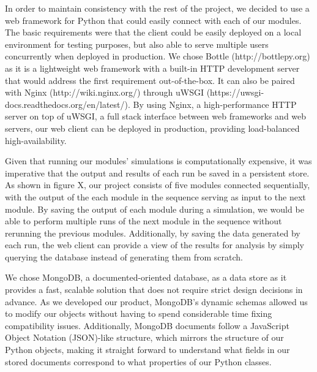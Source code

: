 \documentclass[a4paper,11pt]{article}
\begin{document}
In order to maintain consistency with the rest of the project, we decided to use a web framework for Python that could easily connect with each of our modules. The basic requirements were that the client could be easily deployed on a local environment for testing purposes, but also able to serve multiple users concurrently when deployed in production. We chose Bottle (http://bottlepy.org) as it is a lightweight web framework with a built-in HTTP development server that would address the first requirement out-of-the-box. It can also be paired with Nginx (http://wiki.nginx.org/) through uWSGI (https://uwsgi-docs.readthedocs.org/en/latest/). By using Nginx, a high-performance HTTP server on top of uWSGI, a full stack interface between web frameworks and web servers, our web client can be deployed in production, providing load-balanced high-availability.

Given that running our modules' simulations is computationally expensive, it was imperative that the output and results of each run be saved in a persistent store. As shown in figure X, our project consists of five modules connected sequentially, with the output of the each module in the sequence serving as input to the next module. By saving the output of each module during a simulation, we would be able to perform multiple runs of the next module in the sequence without rerunning the previous modules. Additionally, by saving the data generated by each run, the web client can provide a view of the results for analysis by simply querying the database instead of generating them from scratch.

We chose MongoDB, a documented-oriented database, as a data store as it provides a fast, scalable solution that does not require strict design decisions in advance. As we developed our product, MongoDB's dynamic schemas allowed us to modify our objects without having to spend considerable time fixing compatibility issues. Additionally, MongoDB documents follow a JavaScript Object Notation (JSON)-like structure, which mirrors the structure of our Python objects, making it straight forward to understand what fields in our stored documents correspond to what properties of our Python classes.
\noindent
[DOCUMENT] [OBJECT]
\end{document}
